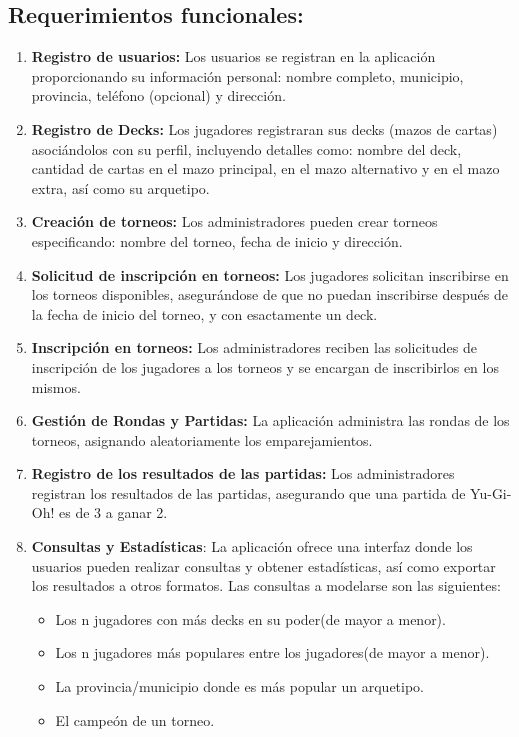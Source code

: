\documentclass[a4paper]{article}
\begin{document}
\subsection{Requerimientos funcionales:}
\begin{enumerate}
	\item \textbf{Registro de usuarios:} Los usuarios se registran en la aplicación proporcionando su información personal: nombre completo, municipio, provincia, teléfono (opcional) y dirección.
	\item \textbf{Registro de Decks:} Los jugadores registraran sus decks (mazos de cartas) asoci\'andolos con su perfil, incluyendo detalles como: nombre del deck, cantidad de cartas en el mazo principal, en el mazo alternativo y en el mazo extra, así como su arquetipo.
	\item \textbf{Creaci\'on de torneos:} Los administradores pueden crear torneos especificando: nombre del torneo, fecha de inicio y dirección.
	\item \textbf{Solicitud de inscripci\'on en torneos:} Los jugadores solicitan inscribirse en los torneos disponibles, asegur\'andose de que no puedan inscribirse despu\'es de la fecha de inicio del torneo, y con esactamente un deck. 
	\item \textbf{Inscripci\'on en torneos:} Los administradores reciben las solicitudes de inscripci\'on de los jugadores a los torneos y se encargan de inscribirlos en los mismos.
    \item \textbf{Gestión de Rondas y Partidas:} La aplicaci\'on administra las rondas de los torneos, asignando aleatoriamente los emparejamientos.
    \item \textbf{Registro de los resultados de las partidas:} Los administradores registran los resultados de las partidas, asegurando que una partida de Yu-Gi-Oh! es de 3 a ganar 2.
    \item \textbf{Consultas y Estad\'isticas}: La aplicaci\'on ofrece una interfaz donde los usuarios pueden realizar consultas y obtener estad\'isticas, as\'i como exportar los resultados a otros formatos. Las consultas a modelarse son las siguientes:
    \begin{itemize}
    \item Los n jugadores con m\'as decks en su poder(de mayor a menor).
    \item Los n jugadores m\'as populares entre los jugadores(de mayor a menor).
    \item La provincia/municipio donde es m\'as popular un arquetipo.
    \item El campe\'on de un torneo.

\end{itemize}
\end{enumerate}
\end{document}
